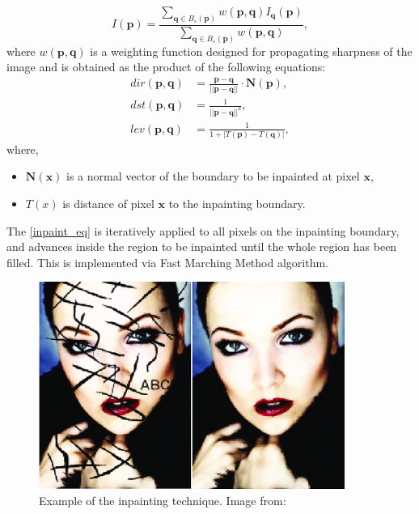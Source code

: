 \documentclass[twoside]{ctuthesis}
\theoremstyle{plain}
\theoremstyle{definition}
\theoremstyle{note}
\begin{document}
\begin{equation}\label{inpaint_eq}
	I(\mathbf{p})=\frac{\sum_{\mathbf{q}\in B_{\varepsilon}(\mathbf{p})}w(\mathbf{p},\mathbf{q})I_{\mathbf{q}}(\mathbf{p})}{\sum_{\mathbf{q}\in B_{\varepsilon}(\mathbf{p})}w(\mathbf{p},\mathbf{q})},
\end{equation}
where $w(\mathbf{p},\mathbf{q})$ is a weighting function designed for propagating sharpness of the image and is obtained as the product of the following equations:
\begin{equation}
	\begin{aligned}
		dir(\mathbf{p},\mathbf{q})&=\frac{\mathbf{p}-\mathbf{q}}{||\mathbf{p}-\mathbf{q}||}\cdot\mathbf{N(p)},\\
		dst(\mathbf{p},\mathbf{q})&=\frac{1}{||\mathbf{p}-\mathbf{q}||^2},\\
		lev(\mathbf{p},\mathbf{q})&=\frac{1}{1+|T(\mathbf{p})-T(\mathbf{q})|},
	\end{aligned}
\end{equation}
where,
\begin{itemize}
	\item $\mathbf{N(x)}$ is a normal vector of the boundary to be inpainted at pixel $\mathbf{x}$,
	\item $T(x)$ is distance of pixel $\mathbf{x}$ to the inpainting boundary.
\end{itemize}
The \eqref{inpaint_eq} is iteratively applied to all pixels on the inpainting boundary, and advances inside the region to be inpainted until the whole region has been filled. This is implemented via Fast Marching Method algorithm.
\begin{figure}
	\caption{Example of the inpainting technique. Image from: \cite{cite:5}}
	\includegraphics[width=10cm]{inpaint_example.png}
	\centering
\end{figure}
\end{document}
